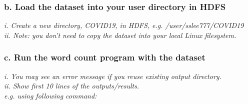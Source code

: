 \documentclass[]{article}
\begin{document}
\subsubsection*{b. Load the dataset into your user directory in HDFS}
\emph{i. Create a new directory, COVID19, in HDFS, 
	e.g. /user/sslee777/COVID19	\\
	ii. Note: you don’t need to copy the dataset into your local Linux filesystem.}



\subsubsection*{c. Run the word count program with the dataset}
\emph{i. You may see an error message if you reuse existing output directory. \\
	ii. Show first 10 lines of the outputs/results. \\ 
	e.g. using following command: }
\end{document}
